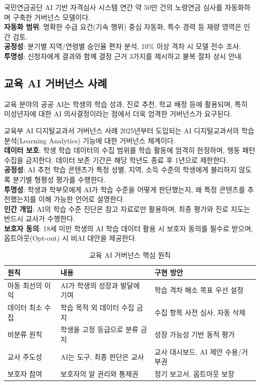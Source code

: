 \begin{practicaltool}{국민연금공단 AI 기반 자격심사 시스템}
연간 약 50만 건의 노령연금 심사를 자동화하며 구축한 거버넌스 모델이다.\\
\textbf{자동화 범위}: 명확한 수급 요건(기속 행위) 중심 자동화, 특수 경력 등 재량 영역은 인간 검토.\\
\textbf{공정성}: 분기별 지역/연령별 승인율 편차 분석, 10\% 이상 격차 시 모델 전수 조사.\\
\textbf{투명성}: 신청자에게 결과와 함께 결정 근거 3가지를 제시하고 불복 절차 상시 안내.
\end{practicaltool}

\subsection{교육 AI 거버넌스 사례}

교육 분야의 공공 AI는 학생의 학습 성과, 진로 추천, 학교 배정 등에 활용되며, 특히 미성년자에 대한 AI 의사결정이라는 점에서 더욱 엄격한 거버넌스가 요구된다.

\begin{practicaltool}{교육부 AI 디지털교과서 거버넌스 사례}
2025년부터 도입되는 AI 디지털교과서의 학습 분석(Learning Analytics) 기능에 대한 거버넌스 체계이다.\\
\textbf{데이터 보호}: 학생 학습 데이터의 수집 범위를 학습 활동에 엄격히 한정하며, 행동 패턴 수집을 금지한다. 데이터 보존 기간은 해당 학년도 종료 후 1년으로 제한한다.\\
\textbf{공정성}: AI 추천 학습 콘텐츠가 특정 성별, 지역, 소득 수준의 학생에게 불리하지 않도록 분기별 형평성 평가를 수행한다.\\
\textbf{투명성}: 학생과 학부모에게 AI가 학습 수준을 어떻게 판단했는지, 왜 특정 콘텐츠를 추천했는지를 이해 가능한 언어로 설명한다.\\
\textbf{인간 개입}: AI의 학습 수준 진단은 참고 자료로만 활용하며, 최종 평가와 진로 지도는 반드시 교사가 수행한다.\\
\textbf{보호자 동의}: 18세 미만 학생의 AI 학습 데이터 활용 시 보호자 동의를 필수로 받으며, 옵트아웃(Opt-out) 시 비AI 대안을 제공한다.
\end{practicaltool}

\begin{table}[htbp]
\centering
\caption{교육 AI 거버넌스 핵심 원칙}
\label{tab:18_edu_ai}
\begin{tabularx}{\textwidth}{p{2.5cm}Xp{4cm}}
\toprule
\textbf{원칙} & \textbf{내용} & \textbf{구현 방안} \\
\midrule
아동 최선의 이익 & AI가 학생의 성장과 발달에 기여 & 학습 격차 해소 목표 우선 설정 \\
데이터 최소 수집 & 학습 목적 외 데이터 수집 금지 & 수집 항목 사전 심사, 자동 삭제 \\
비분류 원칙 & 학생을 고정 등급으로 분류 금지 & 성장 가능성 기반 동적 평가 \\
교사 주도성 & AI는 도구, 최종 판단은 교사 & 교사 대시보드, AI 제안 수용/거부권 \\
보호자 참여 & 보호자의 알 권리와 통제권 & 정기 보고서, 옵트아웃 보장 \\
\bottomrule
\end{tabularx}
\end{table}

